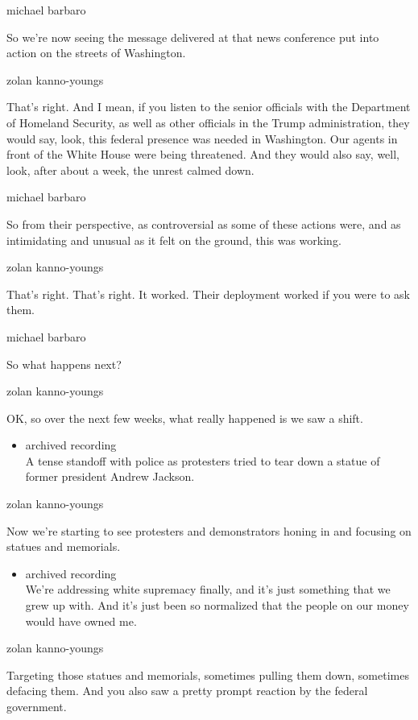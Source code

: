 michael barbaro

So we're now seeing the message delivered at that news conference put
into action on the streets of Washington.

zolan kanno-youngs

That's right. And I mean, if you listen to the senior officials with the
Department of Homeland Security, as well as other officials in the Trump
administration, they would say, look, this federal presence was needed
in Washington. Our agents in front of the White House were being
threatened. And they would also say, well, look, after about a week, the
unrest calmed down.

michael barbaro

So from their perspective, as controversial as some of these actions
were, and as intimidating and unusual as it felt on the ground, this was
working.

zolan kanno-youngs

That's right. That's right. It worked. Their deployment worked if you
were to ask them.

michael barbaro

So what happens next?

zolan kanno-youngs

OK, so over the next few weeks, what really happened is we saw a shift.

\begin{itemize}
\tightlist
\item
  archived recording\\
  A tense standoff with police as protesters tried to tear down a statue
  of former president Andrew Jackson.
\end{itemize}

zolan kanno-youngs

Now we're starting to see protesters and demonstrators honing in and
focusing on statues and memorials.

\begin{itemize}
\tightlist
\item
  archived recording\\
  We're addressing white supremacy finally, and it's just something that
  we grew up with. And it's just been so normalized that the people on
  our money would have owned me.
\end{itemize}

zolan kanno-youngs

Targeting those statues and memorials, sometimes pulling them down,
sometimes defacing them. And you also saw a pretty prompt reaction by
the federal government.

